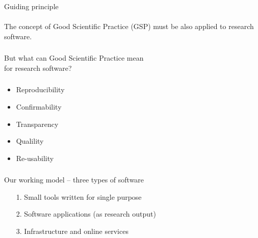 \documentclass{beamer}
\begin{document}
\begin{frame}
  \frametitle{}
  \begin{block}{}
    \begin{center}
      Guiding principle\\\ \\
    The concept of Good Scientific Practice (GSP) must be also applied
    to research software.
    \end{center}
  \end{block}
\end{frame}


\begin{frame}
  \frametitle{}
  \begin{block}{}
    \begin{center}    
      But what can Good Scientific Practice mean\\ for research software?
      \end{center}       
  \end{block}
\end{frame}

\begin{frame}
  \frametitle{}
  \begin{block}{}
    \begin{center}
        \begin{itemize}
        \item Reproducibility
        \item Confirmability          
        \item Transparency
        \item Qualility
        \item Re-usability
        \end{itemize}
      \end{center}       
  \end{block}
\end{frame}

\begin{frame}
  \frametitle{}
  \begin{block}{}
    \begin{center}
      Our working model -- three types of software\\
      \begin{itemize}
      \item[1.] Small tools written for single purpose
      \item[2.] Software applications (as research output)
      \item[3.] Infrastructure and online services
      \end{itemize}
    \end{center}
  \end{block}
\end{frame}
\end{document}
